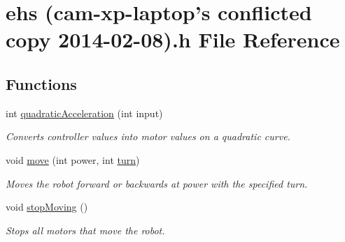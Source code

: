 \hypertarget{ehs_01_07cam-xp-laptop's_01conflicted_01copy_012014-02-08_08_8h}{\section{ehs (cam-\/xp-\/laptop's conflicted copy 2014-\/02-\/08).h File Reference}
\label{ehs_01_07cam-xp-laptop's_01conflicted_01copy_012014-02-08_08_8h}
}
\subsection*{Functions}
\begin{DoxyCompactItemize}
\item 
int \hyperlink{ehs_01_07cam-xp-laptop's_01conflicted_01copy_012014-02-08_08_8h_a8de598dafdddf5af0ca24828a301102c}{quadratic\-Acceleration} (int input)
\begin{DoxyCompactList}\small\item\em Converts controller values into motor values on a quadratic curve. \end{DoxyCompactList}\item 
void \hyperlink{ehs_01_07cam-xp-laptop's_01conflicted_01copy_012014-02-08_08_8h_ae4b7aacebe402774beba8907e20c7d0e}{move} (int power, int \hyperlink{no_more_tank_mode_8c_aaefa47f4fdf865c2358c22b542a993e4}{turn})
\begin{DoxyCompactList}\small\item\em Moves the robot forward or backwards at {\ttfamily power} with the specified turn. \end{DoxyCompactList}\item 
void \hyperlink{ehs_01_07cam-xp-laptop's_01conflicted_01copy_012014-02-08_08_8h_a28bc208dd43c4efebd58e7b1937284f8}{stop\-Moving} ()
\begin{DoxyCompactList}\small\item\em Stops all motors that move the robot. \end{DoxyCompactList}\end{DoxyCompactItemize}


